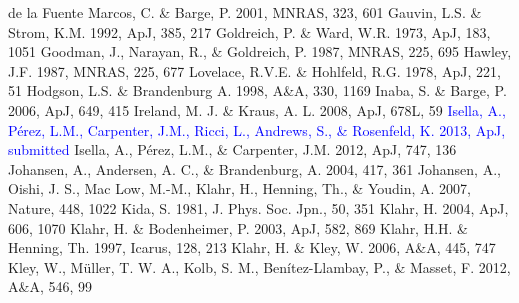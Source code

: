 \documentclass[apj]{emulateapj}
\def\blue#1{\textcolor{blue}{#1}}
\begin{document}
\begin{thebibliography}{}
 de la Fuente Marcos, C. \& Barge, P. 2001, MNRAS, 323, 601 
 Gauvin, L.S. \& Strom, K.M. 1992, ApJ, 385, 217
 Goldreich, P. \& Ward, W.R. 1973, ApJ, 183, 1051
 Goodman, J., Narayan, R., \& Goldreich, P. 1987, MNRAS, 225, 695
 Hawley, J.F. 1987, MNRAS, 225, 677
  Lovelace, R.V.E. \& Hohlfeld, R.G. 1978, ApJ, 221, 51
 Hodgson, L.S. \& Brandenburg A. 1998, A\&A, 330, 1169
 Inaba, S. \& Barge, P. 2006, ApJ, 649, 415
 Ireland, M. J. \& Kraus, A. L. 2008, ApJ, 678L, 59
\bibitem[{{\blue{Isella et al.}}(2013)}]{Isella13} \blue{Isella, A., P\'erez, L.M., Carpenter, J.M., Ricci, L., Andrews, S., \& Rosenfeld, K. 2013, ApJ, submitted}
 Isella, A., P\'erez, L.M., \& Carpenter, J.M. 2012, ApJ, 747, 136
 Johansen, A., Andersen, A. C., \& Brandenburg, A. 2004, 417, 361
 Johansen, A., Oishi, J. S., Mac Low, M.-M., Klahr, H., Henning, Th., \& Youdin, A. 2007, Nature, 448, 1022
 Kida, S. 1981, J. Phys. Soc. Jpn.,  50, 351
 Klahr, H. 2004, ApJ, 606, 1070
 Klahr, H. \& Bodenheimer, P. 2003, ApJ, 582, 869
 Klahr, H.H. \& Henning, Th. 1997, Icarus, 128, 213
 Klahr, H. \& Kley, W. 2006, A\&A, 445, 747
 Kley, W., M\"uller, T. W. A., Kolb, S. M., Ben\'itez-Llambay, P., \& Masset, F. 2012, A\&A, 546, 99

\end{thebibliography}
\end{document}
